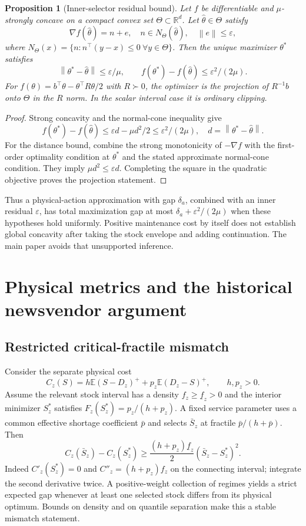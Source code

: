 \documentclass[11pt,letterpaper]{article}
\newtheorem{proposition}[theorem]{Proposition}
\theoremstyle{definition}
\newcommand{\E}{\mathbb E}
\newcommand{\R}{\mathbb R}
\newcommand{\1}{\mathbf 1}
\newcommand{\norm}[1]{\left\lVert#1\right\rVert}
\newcommand{\pos}[1]{(#1)^+}
\begin{document}
\begin{proposition}[Inner-selector residual bound]
Let $f$ be differentiable and $\mu$-strongly concave on a compact convex set $\Theta\subset\R^d$. Let $\widehat\theta\in\Theta$ satisfy
\[
 \nabla f(\widehat\theta)=n+e,\quad
 n\in N_\Theta(\widehat\theta),\quad\norm e\leq\varepsilon,
\]
where $N_\Theta(x)=\{n:n^\top(y-x)\leq0\ \forall y\in\Theta\}$. Then the unique maximizer $\theta^*$ satisfies
\[
 \norm{\theta^*-\widehat\theta}\leq\varepsilon/\mu,
 \qquad f(\theta^*)-f(\widehat\theta)\leq\varepsilon^2/(2\mu).
\]
For $f(\theta)=b^\top\theta-\theta^\top R\theta/2$ with $R\succ0$, the optimizer is the projection of $R^{-1}b$ onto $\Theta$ in the $R$ norm. In the scalar interval case it is ordinary clipping.
\end{proposition}
\begin{proof}
Strong concavity and the normal-cone inequality give
\[
 f(\theta^*)-f(\widehat\theta)
 \leq\varepsilon d-\mu d^2/2\leq\varepsilon^2/(2\mu),
 \quad d=\norm{\theta^*-\widehat\theta}.
\]
For the distance bound, combine the strong monotonicity of $-\nabla f$ with the first-order optimality condition at $\theta^*$ and the stated approximate normal-cone condition. They imply $\mu d^2\leq\varepsilon d$. Completing the square in the quadratic objective proves the projection statement.\end{proof}
Thus a physical-action approximation with gap $\delta_a$, combined with an inner residual $\varepsilon$, has total maximization gap at most $\delta_a+\varepsilon^2/(2\mu)$ when these hypotheses hold uniformly. Positive maintenance cost by itself does not establish global concavity after taking the stock envelope and adding continuation. The main paper avoids that unsupported inference.

\section{Physical metrics and the historical newsvendor argument}
\subsection{Restricted critical-fractile mismatch}
Consider the separate physical cost
\[
 C_z(S)=h\E\pos{S-D_z}+p_z\E\pos{D_z-S},\qquad h,p_z>0.
\]
Assume the relevant stock interval has a density $f_z\geq\underline f_z>0$ and the interior minimizer $S_z^*$ satisfies $F_z(S_z^*)=p_z/(h+p_z)$. A fixed service parameter uses a common effective shortage coefficient $\bar p$ and selects $\bar S_z$ at fractile $\bar p/(h+\bar p)$. Then
\begin{equation}
 C_z(\bar S_z)-C_z(S_z^*)
 \geq\frac{(h+p_z)\underline f_z}{2}(\bar S_z-S_z^*)^2.
\end{equation}
Indeed $C'_z(S_z^*)=0$ and $C''_z=(h+p_z)f_z$ on the connecting interval; integrate the second derivative twice. A positive-weight collection of regimes yields a strict expected gap whenever at least one selected stock differs from its physical optimum. Bounds on density and on quantile separation make this a stable mismatch statement.
\end{document}
